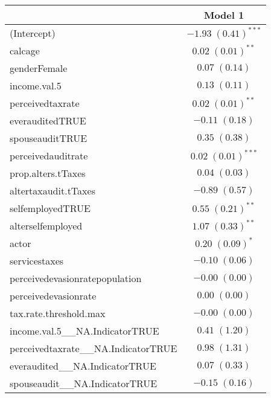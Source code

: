 
\begin{table}
\begin{tabular}{l c }
\hline
 & Model 1 \\
\hline
(Intercept)                                        & $-1.93 \; (0.41)^{***}$ \\
calcage                                            & $0.02 \; (0.01)^{**}$   \\
genderFemale                                       & $0.07 \; (0.14)$        \\
income.val.5                                       & $0.13 \; (0.11)$        \\
perceivedtaxrate                                   & $0.02 \; (0.01)^{**}$   \\
everauditedTRUE                                    & $-0.11 \; (0.18)$       \\
spouseauditTRUE                                    & $0.35 \; (0.38)$        \\
perceivedauditrate                                 & $0.02 \; (0.01)^{***}$  \\
prop.alters.tTaxes                                 & $0.04 \; (0.03)$        \\
altertaxaudit.tTaxes                               & $-0.89 \; (0.57)$       \\
selfemployedTRUE                                   & $0.55 \; (0.21)^{**}$   \\
alterselfemployed                                  & $1.07 \; (0.33)^{**}$   \\
actor                                              & $0.20 \; (0.09)^{*}$    \\
servicestaxes                                      & $-0.10 \; (0.06)$       \\
perceivedevasionratepopulation                     & $-0.00 \; (0.00)$       \\
perceivedevasionrate                               & $0.00 \; (0.00)$        \\
tax.rate.threshold.max                             & $-0.00 \; (0.00)$       \\
income.val.5\_\_NA.IndicatorTRUE                   & $0.41 \; (1.20)$        \\
perceivedtaxrate\_\_NA.IndicatorTRUE               & $0.98 \; (1.31)$        \\
everaudited\_\_NA.IndicatorTRUE                    & $0.07 \; (0.33)$        \\
spouseaudit\_\_NA.IndicatorTRUE                    & $-0.15 \; (0.16)$       \\

\end{tabular}
\end{table}

